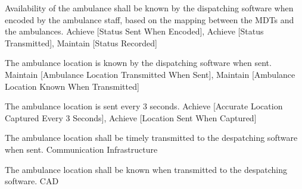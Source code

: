   
    {}
  
  
    {}

  \startkaosspec
  	 {Availability of the ambulance shall be known by the dispatching software when encoded by the ambulance staff, based on the mapping between the MDTs and the ambulances.}
  	 {Achieve [Status Sent When Encoded], Achieve [Status Transmitted], Maintain [Status Recorded]}
  \stopkaosspec
  
  
    {}

  \startkaosspec
  	 {The ambulance location is known by the dispatching software when sent.}
  	 {Maintain [Ambulance Location Transmitted When Sent], Maintain [Ambulance Location Known When Transmitted]}
  \stopkaosspec
  
  \startkaosspec
  	 {The ambulance location is sent every 3 seconds.}
  	 {Achieve [Accurate Location Captured Every 3 Seconds], Achieve [Location Sent When Captured]}
  \stopkaosspec

  \startkaosspec
  	 {The ambulance location shall be timely transmitted to the despatching software when sent.}
  	 {Communication Infrastructure}
  \stopkaosspec

  \startkaosspec
  	 {The ambulance location shall be known when transmitted to the despatching software.}
  	 {CAD}
  \stopkaosspec

